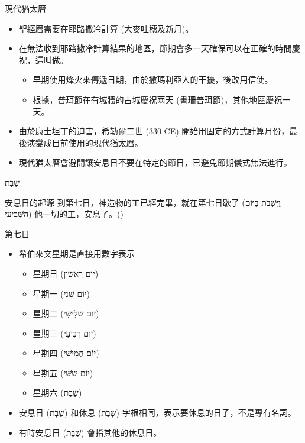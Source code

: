 \documentclass{beamer}
\newcommand{\topic}[1]{
\begin{frame}
    \centering
    \vspace*{1cm}
    {\fontsize{40}{48}\selectfont #1\par}
    \vfill
\end{frame}
}
\newcommand{\parvspace}{\par\vspace{0.5em}}
\begin{document}
\begin{frame}{現代猶太曆}
	\begin{itemize}
		\item 聖經曆需要在耶路撒冷計算 (大麥吐穗及新月)。
		\item 在無法收到耶路撒冷計算結果的地區，節期會多一天確保可以在正確的時間慶祝，這叫做\textcite{YomTovSheni}。
		      \begin{itemize}
			      \item 早期使用烽火來傳遞日期，由於撒瑪利亞人的干擾，後改用信使。
			      \item 根據，普珥節在有城牆的古城慶祝兩天 (書珊普珥節)，其他地區慶祝一天。
		      \end{itemize}
		\item 由於康士坦丁的迫害，希勒爾二世 (330 CE) 開始用固定的方式計算月份，最後演變成目前使用的現代猶太曆。
		\item 現代猶太曆會避開讓安息日不要在特定的節日，已避免節期儀式無法進行。\parencite{HistoryOfCalendar}
	\end{itemize}
\end{frame}

\topic{\texthebrew{שַׁבָּת}}

\begin{frame}{安息日的起源}
	到第七日，神造物的工已經完畢，就在\alert{第七日歇了 (\texthebrew{וַיִּשְׁבֹּת בַּיּוֹם הַשְּׁבִיעִי})} 他一切的工，安息了。()\parvspace
\end{frame}

\begin{frame}{第七日}
	\begin{itemize}
		\item 希伯來文星期是直接用數字表示
		      \begin{itemize}
			      \item 星期日 (\texthebrew{יוֹם רִאשׁוֹן})
			      \item 星期一 (\texthebrew{יוֹם שֵׁנִי})
			      \item 星期二 (\texthebrew{יוֹם שְׁלִישִׁי})
			      \item 星期三 (\texthebrew{יוֹם רְבִיעִי})
			      \item 星期四 (\texthebrew{יוֹם חֲמִישִׁי})
			      \item 星期五 (\texthebrew{יוֹם שִׁשִּׁי})
			      \item 星期六 (\texthebrew{שַׁבָּת})
		      \end{itemize}
		\item 安息日 (\texthebrew{שַׁבָּת}) 和休息 (\texthebrew{שָׁבַת}) 字根相同，表示要休息的日子，不是專有名詞。
		\item 有時安息日 (\texthebrew{שַׁבָּת}) 會指其他的休息日。
	\end{itemize}
\end{frame}
\end{document}
